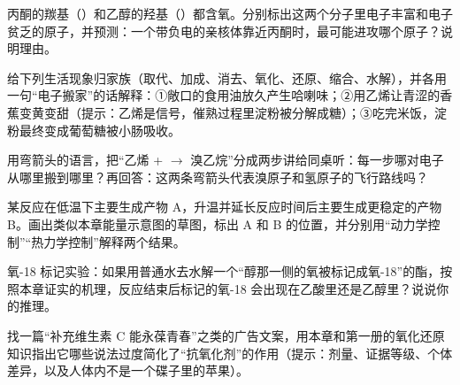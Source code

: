 \begin{sikaoti}
\item 丙酮的羰基（）和乙醇的羟基（）都含氧。分别标出这两个分子里电子丰富和电子贫乏的原子，并预测：一个带负电的亲核体靠近丙酮时，最可能进攻哪个原子？说明理由。
\item 给下列生活现象归家族（取代、加成、消去、氧化、还原、缩合、水解），并各用一句“电子搬家”的话解释：①敞口的食用油放久产生哈喇味；②用乙烯让青涩的香蕉变黄变甜（提示：乙烯是信号，催熟过程里淀粉被分解成糖）；③吃完米饭，淀粉最终变成葡萄糖被小肠吸收。
\item 用弯箭头的语言，把“乙烯 +  $\rightarrow$ 溴乙烷”分成两步讲给同桌听：每一步哪对电子从哪里搬到哪里？再回答：这两条弯箭头代表溴原子和氢原子的飞行路线吗？
\item 某反应在低温下主要生成产物 A，升温并延长反应时间后主要生成更稳定的产物 B。画出类似本章能量示意图的草图，标出 A 和 B 的位置，并分别用“动力学控制”“热力学控制”解释两个结果。
\item 氧-18 标记实验：如果用普通水去水解一个“醇那一侧的氧被标记成氧-18”的酯，按照本章证实的机理，反应结束后标记的氧-18 会出现在乙酸里还是乙醇里？说说你的推理。
\item 找一篇“补充维生素 C 能永葆青春”之类的广告文案，用本章和第一册的氧化还原知识指出它哪些说法过度简化了“抗氧化剂”的作用（提示：剂量、证据等级、个体差异，以及人体内不是一个碟子里的苹果）。
\end{sikaoti}
